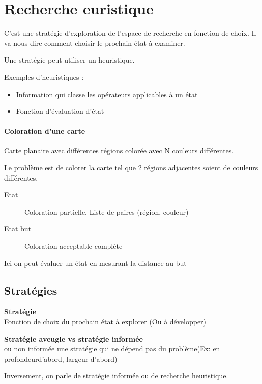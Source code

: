 \documentclass[12pt,a4paper,openany]{book}
\begin{document}
		\section{Recherche euristique}
		C'est une stratégie d'exploration de l'espace de recherche en fonction de choix. Il va nous dire comment choisir le prochain état à examiner.

		Une stratégie peut utiliser un heuristique.

			\begin{exemple}
				Exemples d'heuristiques : 
				\begin{itemize}
					\item Information qui classe les opérateurs applicables à un état
					\item Fonction d'évaluation d'état
			\end{itemize}
		\end{exemple}

		\begin{exemple}
			\paragraph{Coloration d'une carte}
			Carte planaire avec différentes régions colorée avec N couleurs différentes.

			Le problème est de colorer la carte tel que 2 régions adjacentes soient de couleurs différentes.

			\begin{description}
				\item[Etat]Coloration partielle. Liste de paires (région, couleur)
				\item[Etat but] Coloration acceptable complète
			\end{description}

			Ici on peut évaluer un état en mesurant la distance  au but
		\end{exemple}

		\subsection{Stratégies}
		\begin{definition}
			\textbf{Stratégie}\\ Fonction de choix du prochain état à explorer (Ou à développer)
		\end{definition}

		\begin{definition}
			\textbf{Stratégie aveugle vs stratégie informée}\\ou non informée une stratégie qui ne dépend pas du problème(Ex: en profondeurd'abord, largeur d'abord)

			Inversement, on parle de stratégie informée ou de recherche heuristique.
		\end{definition}
\end{document}
